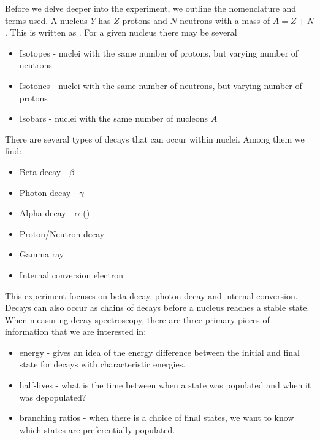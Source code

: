 \noindent Before we delve deeper into the experiment, we outline the nomenclature
and terms used. A nucleus $Y$ has $Z$ protons and $N$ neutrons with a mass of $A = Z + N$.
This is written as . For a given nucleus there may be several
\begin{itemize}
	\item Isotopes - nuclei with the same number of protons, but varying number of neutrons
	\item Isotones - nuclei with the same number of neutrons, but varying number of protons
	\item Isobars - nuclei with the same number of nucleons $A$
\end{itemize}
There are several types of decays that can occur within nuclei. Among them
we find:
\begin{itemize}
	\item Beta decay - $\beta$
	\item Photon decay - $\gamma$
	\item Alpha decay - $\alpha$ ()
	\item Proton/Neutron decay
	\item Gamma ray
	\item Internal conversion electron
\end{itemize}
This experiment focuses on beta decay, photon decay and internal
conversion. Decays can also occur as chains of decays before a nucleus
reaches a stable state. When measuring decay spectroscopy, there are three
primary pieces of information that we are interested in:
\begin{itemize}
	\item energy - gives an idea of the energy difference between the initial
	and final state for decays with characteristic energies.
	\item half-lives - what is the time between when a state was populated
	and when it was depopulated?
	\item branching ratios - when there is a choice of final states, we want
	to know which states are preferentially populated.
\end{itemize}
